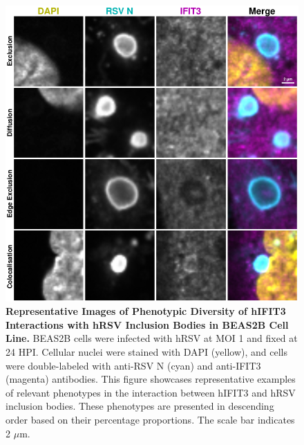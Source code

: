 \begin{figure}
    \centering
    \includegraphics[width=1\linewidth]{08. Chapter 3/Figs/02. Infection/03. IFIT3/06. beas2b i3.pdf}
    \caption[Representative Images of Phenotypic Diversity of hIFIT3 Interactions with hRSV Inclusion Bodies in BEAS2B Cell Line]{\textbf{Representative Images of Phenotypic Diversity of hIFIT3 Interactions with hRSV Inclusion Bodies in BEAS2B Cell Line.} BEAS2B cells were infected with hRSV at MOI 1 and fixed at 24 HPI. Cellular nuclei were stained with DAPI (yellow), and cells were double-labeled with anti-RSV N (cyan) and anti-IFIT3 (magenta) antibodies. This figure showcases representative examples of relevant phenotypes in the interaction between hIFIT3 and hRSV inclusion bodies. These phenotypes are presented in descending order based on their percentage proportions. The scale bar indicates 2 \(\mu \mbox{m}\).}
    \label{fig:Representative Images of Phenotypic Diversity of hIFIT3 Interactions with hRSV Inclusion Bodies in BEAS2B Cell Line}
\end{figure}

